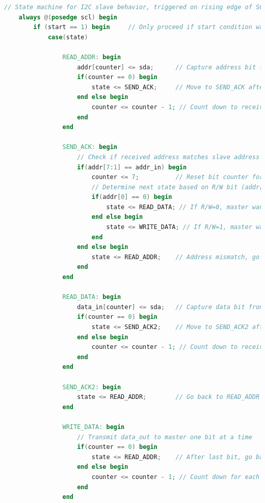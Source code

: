 \documentclass[a4paper,12pt]{report}
\begin{document}
\begin{lstlisting}[language=Verilog, caption={I2C Slave Module in Verilog}, label=lst:i2c_slave]
    // State machine for I2C slave behavior, triggered on rising edge of SCL
    always @(posedge scl) begin
        if (start == 1) begin     // Only proceed if start condition was detected
            case(state)
                
                READ_ADDR: begin
                    addr[counter] <= sda;      // Capture address bit from SDA
                    if(counter == 0) begin
                        state <= SEND_ACK;     // Move to SEND_ACK after receiving full address
                    end else begin
                        counter <= counter - 1; // Count down to receive 8 bits
                    end
                end
                
                SEND_ACK: begin
                    // Check if received address matches slave address (addr_in)
                    if(addr[7:1] == addr_in) begin
                        counter <= 7;          // Reset bit counter for next data frame
                        // Determine next state based on R/W bit (addr[0])
                        if(addr[0] == 0) begin 
                            state <= READ_DATA; // If R/W=0, master wants to write, go to READ_DATA
                        end else begin
                            state <= WRITE_DATA; // If R/W=1, master wants to read, go to WRITE_DATA
                        end
                    end else begin
                        state <= READ_ADDR;    // Address mismatch, go back to READ_ADDR
                    end
                end
                
                READ_DATA: begin
                    data_in[counter] <= sda;   // Capture data bit from SDA
                    if(counter == 0) begin
                        state <= SEND_ACK2;    // Move to SEND_ACK2 after receiving full byte
                    end else begin
                        counter <= counter - 1; // Count down to receive 8 bits
                    end
                end
                
                SEND_ACK2: begin
                    state <= READ_ADDR;        // Go back to READ_ADDR to listen for next address
                end
                
                WRITE_DATA: begin
                    // Transmit data_out to master one bit at a time
                    if(counter == 0) begin
                        state <= READ_ADDR;    // After last bit, go back to READ_ADDR
                    end else begin
                        counter <= counter - 1; // Count down for each bit sent
                    end
                end
                

\end{lstlisting}
\end{document}
